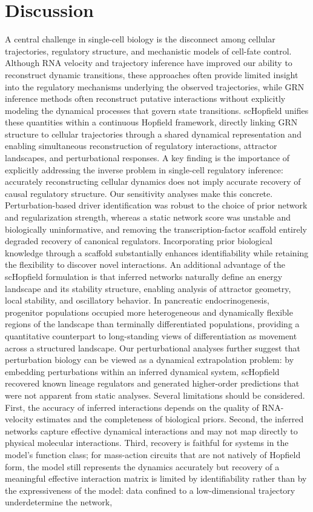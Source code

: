 \documentclass[11pt]{article}
\begin{document}
\section*{Discussion}
A central challenge in single-cell biology is the disconnect among cellular trajectories, regulatory structure, and mechanistic models of cell-fate control. Although RNA velocity and trajectory inference have improved our ability to reconstruct dynamic transitions, these approaches often provide limited insight into the regulatory mechanisms underlying the observed trajectories, while GRN inference methods often reconstruct putative interactions without explicitly modeling the dynamical processes that govern state transitions. scHopfield unifies these quantities within a continuous Hopfield framework, directly linking GRN structure to cellular trajectories through a shared dynamical representation and enabling simultaneous reconstruction of regulatory interactions, attractor landscapes, and perturbational responses.  A key finding is the importance of explicitly addressing the inverse problem in single-cell regulatory inference: accurately reconstructing cellular dynamics does not imply accurate recovery of causal regulatory structure. Our sensitivity analyses make this concrete. Perturbation-based driver identification was robust to the choice of prior network and regularization strength, whereas a static network score was unstable and biologically uninformative, and removing the transcription-factor scaffold entirely degraded recovery of canonical regulators. Incorporating prior biological knowledge through a scaffold substantially enhances identifiability while retaining the flexibility to discover novel interactions.  An additional advantage of the scHopfield formulation is that inferred networks naturally define an energy landscape and its stability structure, enabling analysis of attractor geometry, local stability, and oscillatory behavior. In pancreatic endocrinogenesis, progenitor populations occupied more heterogeneous and dynamically flexible regions of the landscape than terminally differentiated populations, providing a quantitative counterpart to long-standing views of differentiation as movement across a structured landscape. Our perturbational analyses further suggest that perturbation biology can be viewed as a dynamical extrapolation problem: by embedding perturbations within an inferred dynamical system, scHopfield recovered known lineage regulators and generated higher-order predictions that were not apparent from static analyses.  Several limitations should be considered. First, the accuracy of inferred interactions depends on the quality of RNA-velocity estimates and the completeness of biological priors. Second, the inferred networks capture effective dynamical interactions and may not map directly to physical molecular interactions. Third, recovery is faithful for systems in the model's function class; for mass-action circuits that are not natively of Hopfield form, the model still represents the dynamics accurately but recovery of a meaningful effective interaction matrix is limited by identifiability rather than by the expressiveness of the model: data confined to a low-dimensional trajectory underdetermine the network, 
\end{document}
